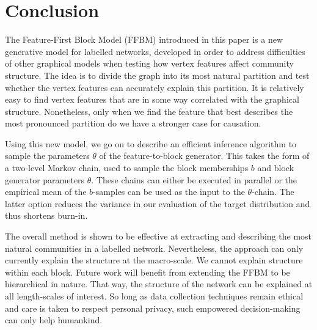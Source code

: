 \section{Conclusion}
\label{sec:conclusion}

The Feature-First Block Model (FFBM) introduced 
in this paper is a new generative model for labelled networks,
developed in order to address difficulties of other graphical models 
when testing how vertex features affect community structure. The idea 
is to divide the graph into its most natural partition and test whether 
the vertex features can accurately explain this partition. 
It is relatively easy to find vertex features that are in some way 
correlated with the graphical structure. Nonetheless, only when 
we find the feature that best describes the most pronounced partition 
do we have a stronger case for causation.

Using this new model,
we go on to describe an efficient inference algorithm to sample 
the parameters $\theta$ of the feature-to-block generator. 
This takes the form of a two-level Markov chain,
used to sample the block memberships $b$ and block generator 
parameters $\theta$. These chains can either be executed
in parallel or 
the empirical mean of the $b$-samples can be used
as the input to the $\theta$-chain. The latter option
reduces the variance in our evaluation of the target distribution 
and thus shortens burn-in.

The overall method is shown to be effective at extracting and describing 
the most natural communities in a labelled network. Nevertheless, the approach 
can only currently explain the structure at the macro-scale. We cannot 
explain structure within each block. Future work will benefit from extending 
the FFBM to be hierarchical in nature. That way, the structure of the network 
can be explained at all length-scales of interest. So long as data 
collection techniques remain ethical and care is taken to respect 
personal privacy, such empowered decision-making can only help humankind.


